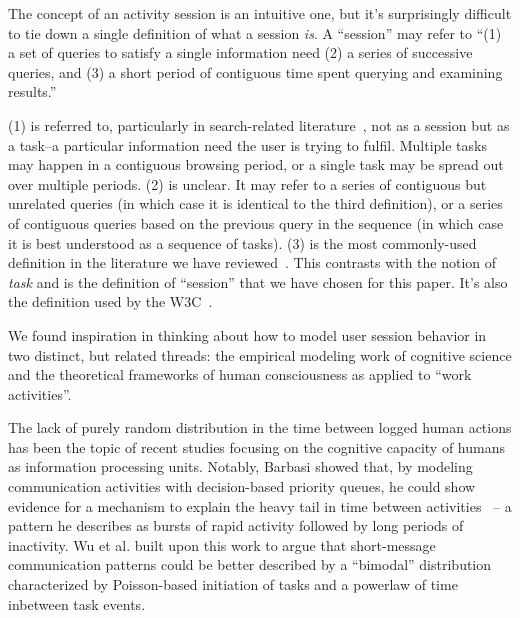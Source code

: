 The concept of an activity session is an intuitive one, but it's surprisingly difficult to tie down a single definition of what a session \emph{is}.  A ``session'' may refer to ``(1) a set of queries to satisfy a single information need (2) a series of successive queries, and (3) a short period of contiguous time spent querying and examining results.''~\cite{jones2008beyond}

(1) is referred to, particularly in search-related literature~\cite{eickhoff2014lessons,jones2008beyond}, not as a session but as a task--a particular information need the user is trying to fulfil.  Multiple tasks may happen in a contiguous browsing period, or a single task may be spread out over multiple periods.
(2) is unclear. It may refer to a series of contiguous but unrelated queries (in which case it is identical to the third definition), or a series of contiguous queries based on the previous query in the sequence (in which case it is best understood as a sequence of tasks).
(3) is the most commonly-used definition in the literature we have reviewed~\cite{govseva2006empirical,nadjarbashi2004improving,spiliopoulou2003framework,white2010assessing}. This contrasts with the notion of \emph{task} and is the definition of ``session'' that we have chosen for this paper. It's also the definition used by the W3C~\cite{W3C1999}.

We found inspiration in thinking about how to model user session behavior in two distinct, but related threads: the empirical modeling work of cognitive science and the theoretical frameworks of human consciousness as applied to ``work activities''.

The lack of purely random distribution in the time between logged human actions has been the topic of recent studies focusing on the cognitive capacity of humans as information processing units.  Notably, Barbasi showed that, by modeling communication activities with decision-based priority queues, he could show evidence for a mechanism to explain the heavy tail in time between activities~\cite{barabasi2005origin} -- a pattern he describes as bursts of rapid activity followed by long periods of inactivity.  Wu et al. built upon this work to argue that short-message communication patterns could be better described by a ``bimodal'' distribution characterized by Poisson-based initiation of tasks and a powerlaw of time inbetween task events\cite{wu2010evidence}.

